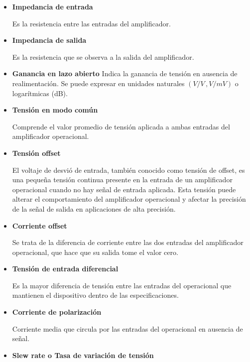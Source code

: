         \begin{itemize}
            \item \textbf{Impedancia de entrada}

                Es la resistencia entre las entradas del amplificador.

            \item \textbf{Impedancia de salida}

                Es la resistencia que se observa a la salida del amplificador.

            \item \textbf{Ganancia en lazo abierto}
                Indica la ganancia de tensión en ausencia de realimentación. Se puede expresar en unidades naturales $(V/V \, \text{,} \, V/mV)$ o logarítmicas (dB).

            \item \textbf{Tensión en modo común}

                Comprende el valor promedio de tensión aplicada a ambas entradas del amplificador operacional.

            \item \textbf{Tensión offset}

                 El voltaje de desvió de entrada, también conocido como tensión de offset, es una pequeña tensión continua presente en la entrada de un amplificador operacional cuando no hay señal de entrada aplicada. Esta tensión puede alterar el comportamiento del amplificador operacional y afectar la precisión de la señal de salida en aplicaciones de alta precisión.

            \item \textbf{Corriente offset}

                Se trata de la diferencia de corriente entre las dos entradas del amplificador operacional, que hace que su salida tome el valor cero.

            \item \textbf{Tensión de entrada diferencial}

                Es la mayor diferencia de tensión entre las entradas del operacional que mantienen el dispositivo dentro de las especificaciones.

            \item \textbf{Corriente de polarización}

                Corriente media que circula por las entradas del operacional en ausencia de señal.

            \item \textbf{Slew rate o Tasa de variación de tensión}


\end{itemize}
